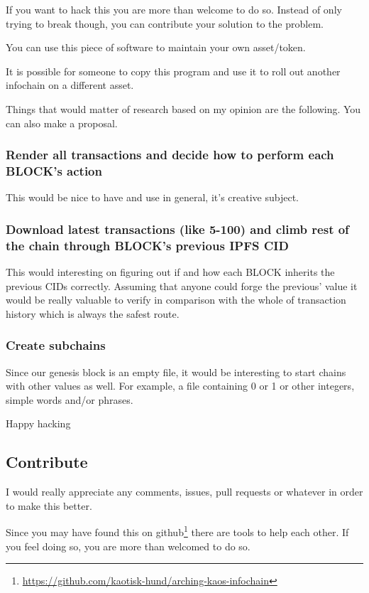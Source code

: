 \documentclass[10pt,a4paper]{paper}
\begin{document}
If you want to hack this you are more than welcome to do so. Instead of only trying to break though, you can contribute your solution to the problem.

You can use this piece of software to maintain your own asset/token.

It is possible for someone to copy this program and use it to roll out another infochain on a different asset.

Things that would matter of research based on my opinion are the following. You can also make a proposal.

\subsubsection{Render all transactions and decide how to perform each BLOCK's action}
	This would be nice to have and use in general, it's creative subject.
	
\subsubsection{Download latest transactions (like 5-100) and climb rest of the chain through BLOCK's previous IPFS CID}
 This would interesting on
	figuring out if and how each BLOCK inherits the previous CIDs
	correctly. Assuming that anyone could forge the previous' value it
	would be really valuable to verify in comparison with the whole of
	transaction history which is always the safest route.
	
\subsubsection{Create subchains}
 Since our genesis block is an empty file, it would be
	interesting to start chains with other values as well. For example, a
	file containing 0 or 1 or other integers, simple words and/or phrases.


Happy hacking


	\subsection{Contribute}\label{contribute}

I would really appreciate any comments, issues, pull requests or whatever in order to make this better.

Since you may have found this on github\footnote{\url{https://github.com/kaotisk-hund/arching-kaos-infochain}} there are tools to help each other. If you feel doing so, you are more than welcomed to do so.
\end{document}
